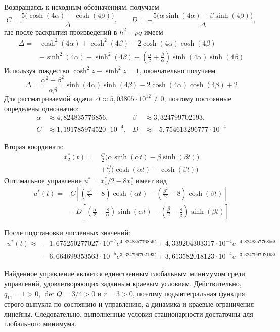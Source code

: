Возвращаясь к исходным обозначениям, получаем
\[
C=\frac{5\bigl(\cosh(4\alpha)-\cosh(4\beta)\bigr)}{\Delta},
\qquad
D=-\frac{5\bigl(\alpha\sinh(4\alpha)-\beta\sinh(4\beta)\bigr)}{\Delta},
\]
где после раскрытия произведений в $h^2-pq$ имеем
\[
\begin{aligned}
\Delta={}&\cosh^2(4\alpha)+\cosh^2(4\beta)
-2\cosh(4\alpha)\cosh(4\beta)\\
&-\sinh^2(4\alpha)-\sinh^2(4\beta)
+\left(\frac\alpha\beta+\frac\beta\alpha\right)
\sinh(4\alpha)\sinh(4\beta)
\end{aligned}
\]
Используя тождество $\cosh^2z-\sinh^2z=1$, окончательно получаем
\[
\Delta=\frac{\alpha^2+\beta^2}{\alpha\beta}
\sinh(4\alpha)\sinh(4\beta)
-2\cosh(4\alpha)\cosh(4\beta)+2
\]
Для рассматриваемой задачи $\Delta\approx5{,}03805\cdot10^{12}\ne0$,
поэтому постоянные определены однозначно:
\[
\begin{aligned}
\alpha&\approx4{,}824835776856,&
\beta&\approx3{,}324799702193,\\
C&\approx1{,}191785974520\cdot10^{-4},&
D&\approx-5{,}754613296777\cdot10^{-4}
\end{aligned}
\]

Вторая координата:
\[
\begin{aligned}
x_2^*(t)={}&\frac C2\bigl(\alpha\sinh(\alpha t)
-\beta\sinh(\beta t)\bigr)\\
&+\frac D2\bigl(\cosh(\alpha t)-\cosh(\beta t)\bigr)
\end{aligned}
\]
Оптимальное управление $u^*=\ddot x_1^*/2-8x_1^*$ имеет вид
\[
\boxed{
\begin{aligned}
u^*(t)={}&C\left[\left(\frac{\alpha^2}{2}-8\right)\cosh(\alpha t)
-\left(\frac{\beta^2}{2}-8\right)\cosh(\beta t)\right]\\
&+D\left[\left(\frac\alpha2-\frac8\alpha\right)\sinh(\alpha t)
-\left(\frac\beta2-\frac8\beta\right)\sinh(\beta t)\right]
\end{aligned}}
\]

После подстановки численных значений:
\[
\boxed{
\begin{aligned}
u^*(t)\approx{}&-1{,}675250277027\cdot10^{-7}e^{4{,}824835776856t}
+4{,}339204303317\cdot10^{-4}e^{-4{,}824835776856t}\\
&-6{,}664699353563\cdot10^{-5}e^{3{,}324799702193t}
+3{,}613582018123\cdot10^{-4}e^{-3{,}324799702193t}
\end{aligned}}
\]

Найденное управление является единственным глобальным минимумом
среди управлений, удовлетворяющих заданным краевым условиям.
Действительно, $q_{11}=1>0$, $\det Q=3/4>0$ и $r=3>0$,
поэтому подынтегральная функция строго выпукла по состоянию
и управлению, а динамика и краевые ограничения линейны.
Следовательно, выполненные условия стационарности достаточны
для глобального минимума.

